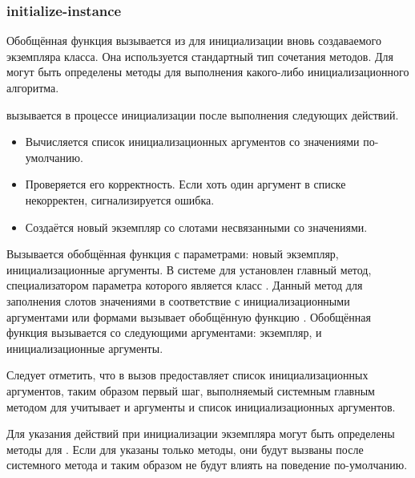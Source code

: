 \subsubsection{initialize-instance}

Обобщённая функция  вызывается из 
для инициализации вновь создаваемого экземпляра класса. Она используется
стандартный тип сочетания методов. Для  могут быть
определены методы для выполнения какого-либо инициализационного алгоритма.

 вызывается в процессе инициализации после выполнения
следующих действий.

\begin{itemize} 

\item Вычисляется список инициализационных аргументов со значениями
  по-умолчанию.

\item Проверяется его корректность. Если хоть один аргумент в списке
  некорректен, сигнализируется ошибка.

\item Создаётся новый экземпляр со слотами несвязанными со значениями.

\end{itemize}

Вызывается обобщённая функция  с параметрами: новый
экземпляр, инициализационные аргументы. В системе для 
установлен главный метод, специализатором параметра которого является класс
. Данный метод для заполнения слотов значениями в
соответствие с инициализационными аргументами или формами  вызывает
обобщённую функцию . Обобщённая функция
 вызывается со следующими аргументами: экземпляр, 
и инициализационные аргументы.

Следует отметить, что  в вызов 
предоставляет список инициализационных аргументов, таким образом первый шаг,
выполняемый системным главным методом для  учитывает и
аргументы  и список инициализационных аргументов.

Для указания действий при инициализации экземпляра могут быть определены методы
для . Если для  указаны только
 методы, они будут вызваны после системного метода и таким образом не
будут влиять на поведение по-умолчанию.

